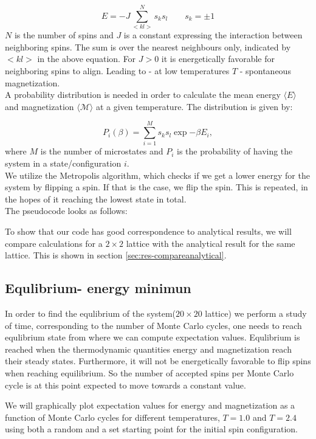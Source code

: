 \documentclass[../main.tex]{subfiles}
\begin{document}
\begin{equation}
  E = -J \sum  _{<kl>}^N s_ks_l \qquad s_k = \pm 1
\end{equation}
$N$ is the number of spins and $J$ is a constant expressing the interaction between neighboring spins. The sum is over the nearest neighbours only, indicated by $<kl>$ in the above equation. For $J>0$ it is energetically favorable for neighboring spins to align. Leading to - at low temperatures $T$ - spontaneous magnetization.\\
A probability distribution is needed in order to calculate the mean energy $\langle E \rangle$ and magnetization $\langle \mathcal M \rangle$ at a given temperature. The distribution is given by:

\begin{equation}
  P_i(\beta)=  \sum  _{i = 1}^M s_ks_l \exp{-\beta E_i},
\end{equation}
where $M$ is the number of microstates and $P_i$ is the probability of having the system in a state/configuration $i$.\\
We utilize the Metropolis algorithm, which checks if we get a lower energy for the system by flipping a spin. If that is the case, we flip the spin. This is repeated, in the hopes of it reaching the lowest state in total. \\
The pseudocode looks as follows:


To show that our code has good correspondence to analytical results, we will compare calculations for a $2 \times 2$ lattice with the analytical result for the same lattice. This is shown in section \ref{sec:res-compareanalytical}.

\subsection{Equlibrium- energy minimun}
In order to find the equlibrium of the system($20\times 20$ lattice) we perform a study of time, corresponding to the number of Monte Carlo cycles, one needs to reach equlibrium state from where we can compute expectation values. Equlibrium is reached when the thermodynamic quantities energy and magnetization reach their steady states. Furthermore, it will not be energetically favorable to flip spins when reaching equilibrium. So the number of accepted spins per Monte Carlo cycle is at this point expected to move towards a constant value.

\noindent We will graphically plot expectation values for energy and magnetization as a function of Monte Carlo cycles for different temperatures, $T=1.0$ and $T= 2.4$ using both a random and a set starting point for the initial spin configuration.
\end{document}

